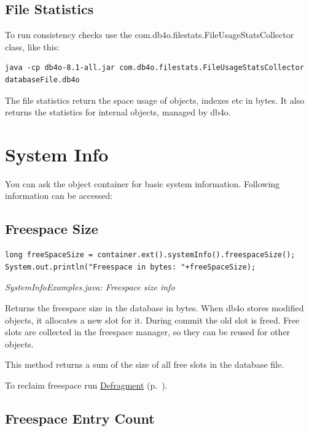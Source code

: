 \subsection*{File Statistics}

To run consistency checks use the com.db4o.filestats.FileUsageStatsCollector class, like this:

\begin{lstlisting}
java -cp db4o-8.1-all.jar com.db4o.filestats.FileUsageStatsCollector databaseFile.db4o
\end{lstlisting}

The file statistics return the space usage of objects, indexes etc in bytes. It also returns the statistics for internal objects, managed by db4o.

\section{System Info}
\label{ref:advanced-topics-system-info}

You can ask the object container for basic system information. Following information can be accessed:

\subsection*{Freespace Size}

\begin{lstlisting}
long freeSpaceSize = container.ext().systemInfo().freespaceSize();
System.out.println("Freespace in bytes: "+freeSpaceSize);
\end{lstlisting}

{\small\itshape SystemInfoExamples.java: Freespace size info\par}
\medskip

Returns the freespace size in the database in bytes. When db4o stores modified objects, it allocates a new slot for it. During commit the old slot is freed. Free slots are collected in the freespace manager, so they can be reused for other objects.

This method returns a sum of the size of all free slots in the database file.

To reclaim freespace run \hyperref[ref:advanced-topics-defragment]{Defragment} (p.~\pageref{ref:advanced-topics-defragment}).

\subsection*{Freespace Entry Count}


